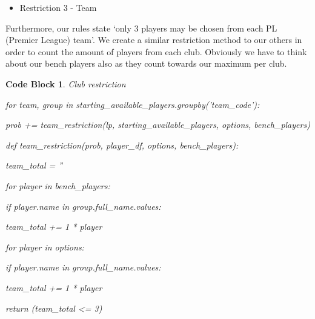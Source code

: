 \documentclass[12pt, a4paper, oneside]{book}
\newtheorem{codeblock}[theorem]{Code Block}
\numberwithin{equation}{section}
\begin{document}
\vspace{0.5cm}

\begin{itemize}
  \item Restriction 3 - Team
\end{itemize}

Furthermore, our rules state `only 3 players may be chosen from each PL (Premier League) team'. We create a similar restriction method to our others in order to count the amount of players from each club. Obviously we have to think about our bench players also as they count towards our maximum per club.

\begin{codeblock}
  Club restriction

  for team, group in starting\_available\_players.groupby('team\_code'):
  
  \hspace{\parindent}prob += team\_restriction(lp, starting\_available\_players, options, bench\_players)
  
  def team\_restriction(prob, player\_df, options, bench\_players):
  
  \hspace{\parindent}team\_total = ''

  \hspace{\parindent}for player in bench\_players:

  \hspace{\parindent}\hspace{\parindent}if player.name in group.full\_name.values:

  \hspace{\parindent}\hspace{\parindent}\hspace{\parindent} team\_total += 1 * player
  
  \hspace{\parindent}for player in options:
  
  \hspace{\parindent}\hspace{\parindent}if player.name in group.full\_name.values:
  
  \hspace{\parindent}\hspace{\parindent}\hspace{\parindent}team\_total += 1 * player
                
  \hspace{\parindent}return (team\_total <= 3)
\end{codeblock}
\end{document}
